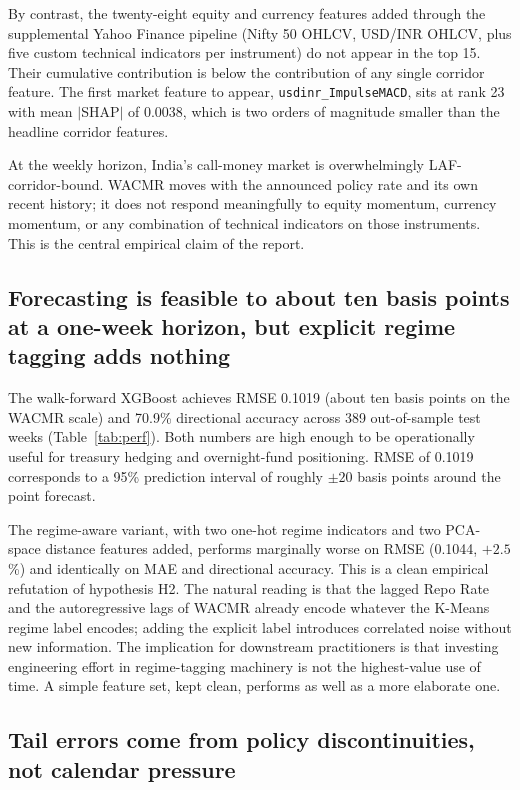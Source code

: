 By contrast, the twenty-eight equity and currency features added
through the supplemental Yahoo Finance pipeline (Nifty 50 OHLCV,
USD/INR OHLCV, plus five custom technical indicators per instrument)
do not appear in the top 15. Their cumulative contribution is below
the contribution of any single corridor feature. The first market
feature to appear, \texttt{usdinr\_ImpulseMACD}, sits at rank 23 with
mean $|$SHAP$|$ of 0.0038, which is two orders of magnitude smaller
than the headline corridor features.

\begin{finding}
At the weekly horizon, India's call-money market is overwhelmingly
LAF-corridor-bound. WACMR moves with the announced policy rate and
its own recent history; it does not respond meaningfully to equity
momentum, currency momentum, or any combination of technical indicators
on those instruments. This is the central empirical claim of the
report.
\end{finding}

\subsection{Forecasting is feasible to about ten basis points at a
one-week horizon, but explicit regime tagging adds nothing}

The walk-forward XGBoost achieves RMSE 0.1019 (about ten basis points
on the WACMR scale) and 70.9\% directional accuracy across 389
out-of-sample test weeks (Table~\ref{tab:perf}). Both numbers are
high enough to be operationally useful for treasury hedging and
overnight-fund positioning. RMSE of 0.1019 corresponds to a 95\%
prediction interval of roughly $\pm 20$ basis points around the point
forecast.

The regime-aware variant, with two one-hot regime indicators and two
PCA-space distance features added, performs marginally worse on RMSE
(0.1044, $+2.5$\%) and identically on MAE and directional accuracy.
This is a clean empirical refutation of hypothesis H2. The natural
reading is that the lagged Repo Rate and the autoregressive lags of
WACMR already encode whatever the K-Means regime label encodes;
adding the explicit label introduces correlated noise without new
information. The implication for downstream practitioners is that
investing engineering effort in regime-tagging machinery is not the
highest-value use of time. A simple feature set, kept clean, performs
as well as a more elaborate one.

\subsection{Tail errors come from policy discontinuities, not
calendar pressure}

